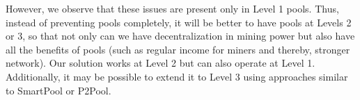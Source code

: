 \documentclass[runningheads]{llncs}
\newcommand{\authnote}[2]{\marginpar{\parbox{\marginparwidth}{\tiny %
  \textsf{#1 {\textcolor{blue}{notes: #2}}}}}%
  \textcolor{blue}{\textbf{\dag}}}
\newcommand{\authnote}[2]{
  \textsf{#1 \textcolor{blue}{: #2}}}
\newcommand{\authnote}[2]{}
\newcommand{\snote}[1]{{\authnote{\textcolor{red}{Scalahub notes}}{#1}}}
\newcommand{\langname}{ErgoScript\xspace}
\newcommand{\poolname}{ErgoPool\xspace}
\begin{document}
However, we observe that these issues are present only in Level 1 pools. Thus, instead of preventing pools completely, it will be better to have pools at Levels 2 or 3, so that not only can we have decentralization in mining power but also have all the benefits of pools (such as regular income for miners and thereby, stronger network). Our solution works at Level 2 but can also operate at Level 1. Additionally, it may be possible to extend it to Level 3 using approaches similar to SmartPool or P2Pool.







\end{document}
